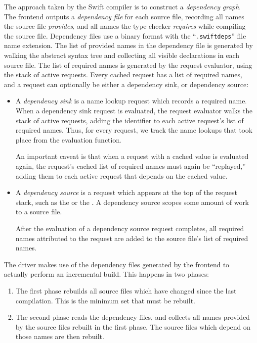 \documentclass[../generics]{subfiles}
\begin{document}
The approach taken by the Swift compiler is to construct a \emph{dependency graph}. The frontend outputs a \emph{dependency file} for each source file, recording all names the source file \emph{provides}, and all names the type checker \emph{requires} while compiling the source file. Dependency files use a binary format with the ``\texttt{.swiftdeps}'' file name extension. The list of provided names in the dependency file is generated by walking the abstract syntax tree and collecting all visible declarations in each source file. The list of required names is generated by the request evaluator, using the stack of active requests. Every cached request has a list of required names, and a request can optionally be either a dependency sink, or dependency source:
\begin{itemize}
\item A \emph{dependency sink} is a name lookup request which records a required name. When a dependency sink request is evaluated, the request evaluator walks the stack of active requests, adding the identifier to each active request's list of required names. Thus, for every request, we track the name lookups that took place from the evaluation function.

An important caveat is that when a request with a cached value is evaluated again, the request's cached list of required names must again be ``replayed,'' adding them to each active request that depends on the cached value.

\item A \emph{dependency source} is a request which appears at the top of the request stack, such as the  or the . A dependency source scopes some amount of work to a source file.

After the evaluation of a dependency source request completes, all required names attributed to the request are added to the source file's list of required names.
\end{itemize}
The driver makes use of the dependency files generated by the frontend to actually perform an incremental build. This happens in two phases:
\begin{enumerate}
\item The first phase rebuilds all source files which have changed since the last compilation. This is the minimum set that must be rebuilt.
\item The second phase reads the dependency files, and collects all names provided by the source files rebuilt in the first phase. The source files which depend on those names are then rebuilt.
\end{enumerate}
\end{document}
